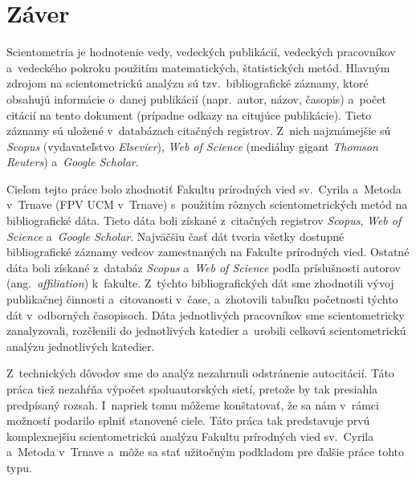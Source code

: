 \chapter*{Záver}

Scientometria je hodnotenie vedy, vedeckých publikácií, vedeckých pracovníkov
a~vedeckého pokroku použitím matematických, štatistických metód.  Hlavným zdrojom
na scientometrickú analýzu sú tzv.~bibliografické záznamy, ktoré obsahujú
informácie o~danej publikácií (napr.~autor, názov, časopis) a~počet citácií na
tento dokument (prípadne odkazy na citujúce publikácie).  Tieto záznamy sú
uložené v~databázach citačných registrov.  Z~nich najznámejšie sú \emph{Scopus}
(vydavateľstvo \emph{Elsevier}), \emph{Web of Science} (mediálny gigant
\emph{Thomson Reuters}) a~\emph{Google Scholar}.

Cieľom tejto práce bolo zhodnotiť Fakultu prírodných vied sv.~Cyrila a~Metoda
v~Trnave (FPV UCM v~Trnave) s~použitím rôznych scientometrických metód na
bibliografické dáta.  Tieto dáta boli získané z~citačných registrov
\emph{Scopus}, \emph{Web of Science} a~\emph{Google Scholar}.  Najväčšiu časť
dát tvoria všetky dostupné bibliografické záznamy vedcov zamestnaných na Fakulte
prírodných vied.  Ostatné dáta boli získané z~databáz \emph{Scopus} a~\emph{Web
  of Science} podľa príslušnosti autorov (ang.~\emph{affiliation}) k~fakulte.
Z~týchto bibliografických dát sme zhodnotili vývoj publikačnej činnosti
a~citovanosti v~čase, a~zhotovili tabuľku početnosti týchto dát v~odborných
časopisoch.  Dáta jednotlivých pracovníkov sme scientometricky zanalyzovali,
rozčlenili do jednotlivých katedier a~urobili celkovú scientometrickú analýzu
jednotlivých katedier.

Z~technických dôvodov sme do analýz nezahrnuli odstránenie autocitácií.  Táto
práca tiež nezahŕňa výpočet spoluautorských sietí, pretože by tak presiahla
predpísaný rozsah.  I~napriek tomu môžeme konštatovať, že sa nám v~rámci
možností podarilo splniť stanovené ciele.  Táto práca tak predstavuje prvú
komplexnejšiu scientometrickú analýzu Fakultu prírodných vied sv.~Cyrila
a~Metoda v~Trnave a~môže sa stať užitočným podkladom pre ďalšie práce tohto typu.

